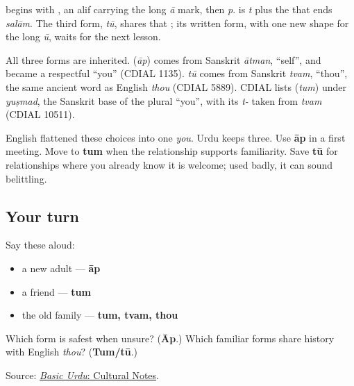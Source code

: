\textbf{} begins with \textbf{}, an alif carrying the long \emph{ā} mark, then \textbf{} \emph{p}. \textbf{} is \textbf{} \emph{t} plus the \textbf{} that ends \emph{salām}. The third form, \emph{tū}, shares that \textbf{}; its written form, with one new shape for the long \emph{ū}, waits for the next lesson.

\begin{cousinweb}
All three forms are inherited. \textbf{} (\emph{āp}) comes from Sanskrit \emph{ātman}, \textquotedblleft{}self\textquotedblright{}, and became a respectful \textquotedblleft{}you\textquotedblright{} (CDIAL 1135). \emph{tū} comes from Sanskrit \emph{tvam}, \textquotedblleft{}thou\textquotedblright{}, the same ancient word as English \emph{thou} (CDIAL 5889). CDIAL lists \textbf{} (\emph{tum}) under \emph{yuṣmad}, the Sanskrit base of the plural \textquotedblleft{}you\textquotedblright{}, with its \emph{t-} taken from \emph{tvam} (CDIAL 10511).
\end{cousinweb}

\begin{grammarlens}[title={Grammar Lens: choose the relationship first}]
English flattened these choices into one \emph{you}. Urdu keeps three. Use \textbf{āp} in a first meeting. Move to \textbf{tum} when the relationship supports familiarity. Save \textbf{tū} for relationships where you already know it is welcome; used badly, it can sound belittling.
\end{grammarlens}

\subsection*{Your turn}
Say these aloud:

\begin{itemize}
\raggedright
  \item a new adult — \textbf{āp}
  \item a friend — \textbf{tum}
  \item the old family — \textbf{tum, tvam, thou}
\end{itemize}

\begin{tcolorbox}[breakable,colback=teal!4,colframe=teal!35!black,title={Before you move on}]
Which form is safest when unsure? (\textbf{Āp}.) Which familiar forms share history with English \emph{thou}? (\textbf{Tum/tū}.)

Source: \href{https://openbooks.lib.msu.edu/urdu/chapter/2-8/}{\emph{Basic Urdu}: Cultural Notes}.
\end{tcolorbox}
